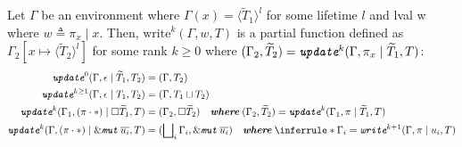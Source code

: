 \begin{subappendices}
\begin{mathpar}
\end{mathpar}
\begin{definition}[Write]
Let $\Gamma$ be an environment where $\Gamma(x) = \langle\widetilde{T}_1\rangle^l$ for some lifetime $l$ and lval w where $w \triangleq \pi_x \mid x$. Then, $\text{write}^k(\Gamma, w, T)$ is a partial function defined as $\Gamma_2[x \mapsto \langle\widetilde{T}_2\rangle^l]$ for some rank $k \geq 0$ where $(\Gamma_2, \widetilde{T}_2) = \emph{\texttt{update}}^k(\Gamma, \pi_x \mid \widetilde{T}_1, T)$:
\begin{align*}
\emph{\texttt{update}}^0(\Gamma, \epsilon \mid \widetilde{T}_1, T_2) &= (\Gamma, T_2) \\
\emph{\texttt{update}}^{k \geq 1}(\Gamma, \epsilon \mid T_1, T_2) &= (\Gamma, T_1 \sqcup T_2) \\
\emph{\texttt{update}}^k(\Gamma_1, (\pi \cdot *) \mid \square\widetilde{T}_1, T) &= (\Gamma_2, \square\widetilde{T}_2) \quad \emph{\textbf{where}}\; (\Gamma_2, \widetilde{T}_2) = \emph{\texttt{update}}^k(\Gamma_1, \pi \mid \widetilde{T}_1, T) \\
\emph{\texttt{update}}^k(\Gamma, (\pi \cdot *) \mid \&\emph{\texttt{mut}}\; \overline{u_i}, T) &= (\bigsqcup\nolimits_i \Gamma_i, \&\emph{\texttt{mut}}\; \overline{u_i}) \quad \emph{\textbf{where}}\; \inferrule*{ }{\Gamma_i = \emph{\texttt{write}}^{k+1}(\Gamma, \pi \mid u_i, T)}
\end{align*}
\end{definition}
\begin{figure}
\begin{mathpar}





\end{mathpar}
\end{figure}
\end{subappendices}

